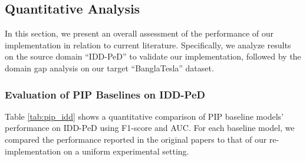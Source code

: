 \documentclass[12pt, a4paper]{article}
\begin{document}
%
%



\subsection{Quantitative Analysis}

In this section, we present an overall assessment of the performance of our implementation in relation to current literature. Specifically, we analyze results on the source domain ``IDD-PeD'' to validate our implementation, followed by the domain gap analysis on our target ``BanglaTesla'' dataset.

\subsubsection{Evaluation of PIP Baselines on IDD-PeD}
Table \ref{tab:pip_idd} shows a quantitative comparison of PIP baseline models' performance on IDD-PeD \cite{bokkasam2025pedestrian} using F1-score and AUC. For each baseline model, we compared the performance reported in the original papers to that of our re-implementation on a uniform experimental setting.\\
\end{document}
